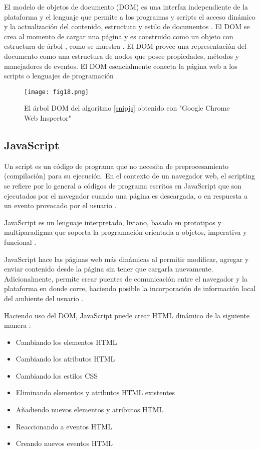 El modelo de objetos de documento (DOM) es una interfaz independiente de la plataforma y el lenguaje que permite a los programas y scripts el acceso dinámico y la actualización del contenido, estructura y estilo de documentos \cite{Rob98}. El DOM se crea al momento de cargar una página y es construido como un objeto con estructura de árbol \cite{JsHD}, como se muestra . El DOM provee una representación del documento como una estructura de nodos que posee propiedades, métodos y manejadores de eventos. El DOM esencialmente conecta la página web a los scripts o lenguajes de programación \cite{MozDOM}.

\begin{figure}[htp]
  \centering
  \texttt{[image: fig18.png]}
  \caption[Modelo de objetos de documento (DOM)]{El árbol DOM del algoritmo \ref{snipjs} obtenido con "Google Chrome Web Inspector"}
  \label{fig:fig18}
\end{figure}

\subsection{JavaScript}

Un script es un código de programa que no necesita de preprocesamiento (compilación) para su ejecución. En el contexto de un navegador web, el scripting se refiere por lo general a códigos de programa escritos en JavaScript que son ejecutados por el navegador cuando una página es descargada, o en respuesta a un evento provocado por el usuario \cite{Js13}.

JavaScript es un lenguaje interpretado, liviano, basado en prototipos y multiparadigma que soporta la programación orientada a objetos, imperativa y funcional \cite{MozJS}.

JavaScript hace las páginas web más dinámicas al permitir modificar, agregar y enviar contenido desde la página sin tener que cargarla nuevamente. Adicionalmente, permite crear puentes de comunicación entre el navegador y la plataforma en donde corre, haciendo posible la incorporación de información local del ambiente del usuario \cite{Js13}.

Haciendo uso del DOM, JavaScript puede crear HTML dinámico de la siguiente manera \cite{JsHD}:

\begin{itemize}
  \item Cambiando los elementos HTML
  \item Cambiando los atributos HTML
  \item Cambiando los estilos CSS
  \item Eliminando elementos y atributos HTML existentes
  \item Añadiendo nuevos elementos y atributos HTML
  \item Reaccionando a eventos HTML
  \item Creando nuevos eventos HTML
\end{itemize}

